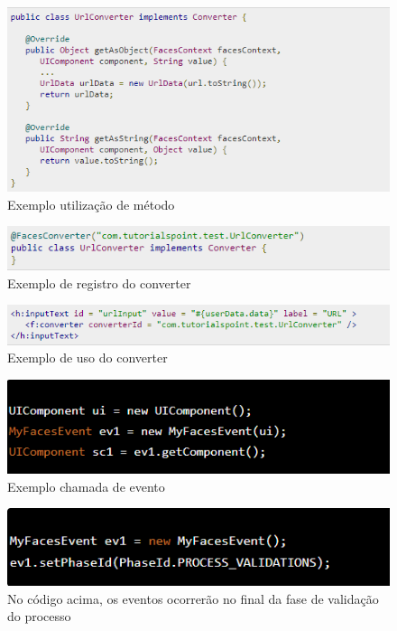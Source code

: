 \documentclass[	DIV=calc,%
							paper=a4,%
							fontsize=12pt,%
							onecolumn]{scrartcl}	 					%
\begin{document}
\begin{figure}
	\centering
	\includegraphics[width=\textwidth]{converters5}
	\caption{Exemplo utilização de método}
	\label{fig8}
\end{figure}


\begin{figure}
	\centering
	\includegraphics[width=\textwidth]{converters6}
	\caption{Exemplo de registro do converter}
	\label{fig9}
\end{figure}


\begin{figure}
	\centering
	\includegraphics[width=\textwidth]{converters7}
	\caption{Exemplo de uso do converter}
	\label{fig10}
\end{figure}


\begin{figure}
	\centering
	\includegraphics[width=\textwidth]{event1}
	\caption{Exemplo chamada de evento}
	\label{fig11}
\end{figure}


\begin{figure}
	\centering
	\includegraphics[width=\textwidth]{event2}
	\caption{No código acima, os eventos ocorrerão no final da fase de validação do processo}
	\label{fig12}
\end{figure}
\end{document}
